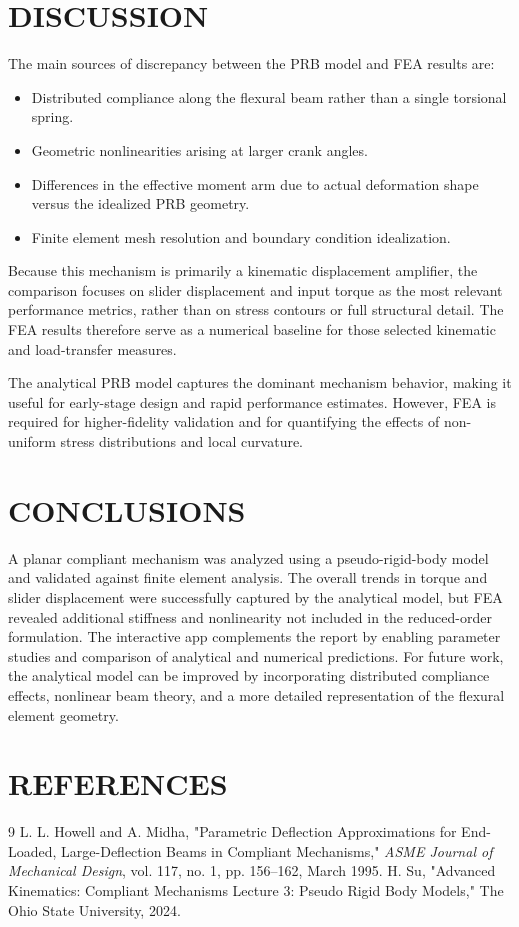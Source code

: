 \documentclass[colorlinks,upint,subscriptcorrection,varvw,hyphenate]{asmeconf}
\begin{document}
\section{DISCUSSION}
The main sources of discrepancy between the PRB model and FEA results are:
\begin{itemize}
    \item Distributed compliance along the flexural beam rather than a single torsional spring.
    \item Geometric nonlinearities arising at larger crank angles.
    \item Differences in the effective moment arm due to actual deformation shape versus the idealized PRB geometry.
    \item Finite element mesh resolution and boundary condition idealization.
\end{itemize}
Because this mechanism is primarily a kinematic displacement amplifier, the comparison focuses on slider displacement and input torque as the most relevant performance metrics, rather than on stress contours or full structural detail. The FEA results therefore serve as a numerical baseline for those selected kinematic and load-transfer measures.

The analytical PRB model captures the dominant mechanism behavior, making it useful for early-stage design and rapid performance estimates. However, FEA is required for higher-fidelity validation and for quantifying the effects of non-uniform stress distributions and local curvature.

\section{CONCLUSIONS}
A planar compliant mechanism was analyzed using a pseudo-rigid-body model and validated against finite element analysis. The overall trends in torque and slider displacement were successfully captured by the analytical model, but FEA revealed additional stiffness and nonlinearity not included in the reduced-order formulation. The interactive app complements the report by enabling parameter studies and comparison of analytical and numerical predictions. For future work, the analytical model can be improved by incorporating distributed compliance effects, nonlinear beam theory, and a more detailed representation of the flexural element geometry.

\section{REFERENCES}
\begin{thebibliography}{9}
     L. L. Howell and A. Midha, "Parametric Deflection Approximations for End-Loaded, Large-Deflection Beams in Compliant Mechanisms," \textit{ASME Journal of Mechanical Design}, vol. 117, no. 1, pp. 156--162, March 1995.
     H. Su, "Advanced Kinematics: Compliant Mechanisms Lecture 3: Pseudo Rigid Body Models," The Ohio State University, 2024.
\end{thebibliography}
\end{document}
